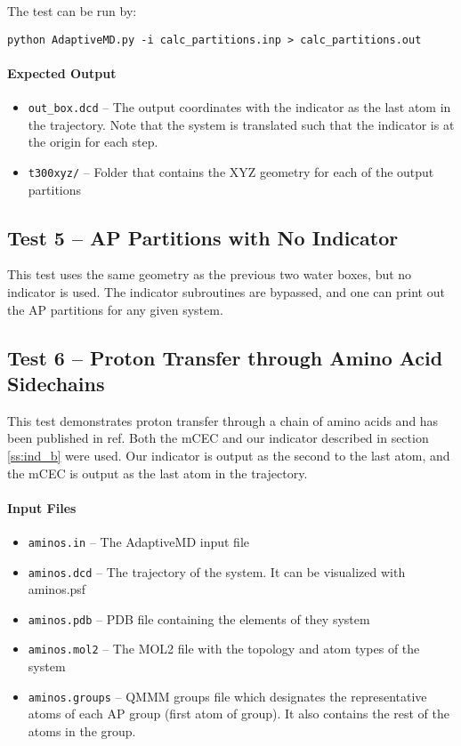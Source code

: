 \documentclass{article}
\begin{document}
The test can be run by:

\texttt{python AdaptiveMD.py -i calc\_partitions.inp > calc\_partitions.out}

\paragraph{Expected Output}
\begin{itemize}
\item \texttt{out\_box.dcd} -- The output coordinates with the indicator as the last atom in the trajectory.
Note that the system is translated such that the indicator is at the origin for each step.
\item \texttt{t300xyz/} -- Folder that contains the XYZ geometry for each of the output partitions
\end{itemize}

\subsection{Test 5 -- AP Partitions with No Indicator}
This test uses the same geometry as the previous two water boxes, but no indicator is used.
The indicator subroutines are bypassed, and one can print out the AP partitions for any given system.

\subsection{Test 6 -- Proton Transfer through Amino Acid Sidechains}
This test demonstrates proton transfer through a chain of amino acids and has been published in ref\cite{Duster2019}.
Both the mCEC and our indicator described in section \ref{ss:ind_b} were used.
Our indicator is output as the second to the last atom, and the mCEC is output as the last atom in the trajectory.


\paragraph{Input Files}
\begin{itemize}
\item \texttt{aminos.in} -- The AdaptiveMD input file
\item \texttt{aminos.dcd} -- The trajectory of the system. It can be visualized with aminos.psf
\item \texttt{aminos.pdb} -- PDB file containing the elements of they system
\item \texttt{aminos.mol2} -- The MOL2 file with the topology and atom types of the system
\item \texttt{aminos.groups} -- \textsc{QMMM} groups file which designates the representative atoms of each AP group (first atom of group).
It also contains the rest of the atoms in the group.
\end{itemize}
\end{document}
